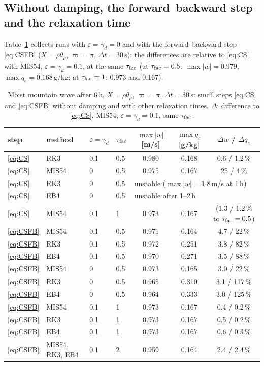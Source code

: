 \documentclass[11pt,a4paper]{article}
\newcommand{\dt}{\Delta t}
\newcommand{\pv}{\varpi}      %
\begin{document}
\subsection{Without damping, the forward--backward step and the relaxation time}\label{sec:hillfb}
Table~\ref{tab:hillfb} collects runs with $\varepsilon=\gamma_d=0$ and with the forward--backward step \eqref{eq:CSFB}
($X=\rho\theta_\rho$, $\pv=\pi$, $\dt=30$\,s); the differences are relative to \eqref{eq:CS} with MIS54, $\varepsilon=\gamma_d=0.1$, at the same
$\tau_{\rm fac}$ (at $\tau_{\rm fac}=0.5$: $\max|w|=0.979$, $\max q_c=0.168$\,g/kg; at $\tau_{\rm fac}=1$: 0.973 and 0.167).
\begin{table}[htbp]\centering\small
\caption{Moist mountain wave after 6\,h, $X=\rho\theta_\rho$, $\pv=\pi$, $\dt=30$\,s: small steps \eqref{eq:CS} and \eqref{eq:CSFB}
without damping and with other relaxation times. $\Delta$: difference to \eqref{eq:CS}, MIS54, $\varepsilon=\gamma_d=0.1$, same $\tau_{\rm fac}$.}\label{tab:hillfb}
\begin{tabular}{llllccc}\toprule
step & method & $\varepsilon=\gamma_d$ & $\tau_{\rm fac}$ & $\max|w|$ [m/s] & $\max q_c$ [g/kg] & $\Delta w$ / $\Delta q_c$\\\midrule
\eqref{eq:CS} & RK3 & 0.1 & 0.5 & 0.980 & 0.168 & 0.6 / 1.2\,\%\\
\eqref{eq:CS} & MIS54 & 0 & 0.5 & 0.975 & 0.167 & 25 / 4\,\%\\
\eqref{eq:CS} & RK3 & 0 & 0.5 & \multicolumn{3}{l}{unstable ($\max|w|=1.8$\,m/s at 1\,h)}\\
\eqref{eq:CS} & EB4 & 0 & 0.5 & \multicolumn{3}{l}{unstable after 1--2\,h}\\
\eqref{eq:CS} & MIS54 & 0.1 & 1 & 0.973 & 0.167 & (1.3 / 1.2\,\% to $\tau_{\rm fac}=0.5$)\\\midrule
\eqref{eq:CSFB} & MIS54 & 0.1 & 0.5 & 0.971 & 0.164 & 4.7 / 22\,\%\\
\eqref{eq:CSFB} & RK3 & 0.1 & 0.5 & 0.972 & 0.251 & 3.8 / 82\,\%\\
\eqref{eq:CSFB} & EB4 & 0.1 & 0.5 & 0.970 & 0.271 & 3.5 / 88\,\%\\
\eqref{eq:CSFB} & MIS54 & 0 & 0.5 & 0.973 & 0.165 & 3.0 / 22\,\%\\
\eqref{eq:CSFB} & RK3 & 0 & 0.5 & 0.965 & 0.310 & 3.1 / 117\,\%\\
\eqref{eq:CSFB} & EB4 & 0 & 0.5 & 0.964 & 0.333 & 3.0 / 125\,\%\\
\eqref{eq:CSFB} & MIS54 & 0.1 & 1 & 0.973 & 0.167 & 0.4 / 0.2\,\%\\
\eqref{eq:CSFB} & RK3 & 0.1 & 1 & 0.973 & 0.167 & 0.5 / 0.2\,\%\\
\eqref{eq:CSFB} & EB4 & 0.1 & 1 & 0.973 & 0.167 & 0.6 / 0.3\,\%\\
\eqref{eq:CSFB} & MIS54, RK3, EB4 & 0.1 & 2 & 0.959 & 0.164 & 2.4 / 2.4\,\%\\\bottomrule
\end{tabular}
\end{table}
\end{document}
